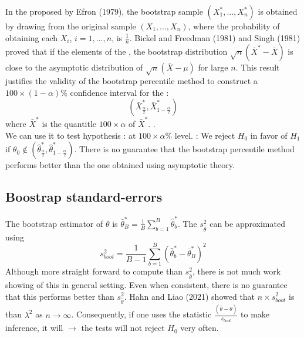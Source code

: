 In the  proposed by Efron (1979), the bootstrap sample $(X_1^*,\ldots,X_n^*)$ is obtained by drawing  from the original sample $(X_1,\ldots,X_n)$,
where the probability of obtaining each $X_i$, $i=1,\ldots,n$, is $\frac{1}{n}$. 
Bickel and Freedman (1981) and Singh (1981) proved that if the elements of the , the bootstrap distribution $\sqrt{n}(\bar{X}^*-\bar{X})$ is close to the asymptotic distribution of $\sqrt{n}(\bar{X}-\mu)$ for large $n$.
This result justifies the validity of the bootstrap percentile method to construct a $100 \times (1-\alpha)\%$ confidence interval for the :
\begin{equation*}
    (\bar{X}^*_{\frac{\alpha}{2}},\bar{X}^*_{1-\frac{\alpha}{2}})
\end{equation*}
where $\bar{X}^*$ is the quantitle $100\times\alpha$ of $\bar{X}^*$.
.\\

We can use it to test hypothesis :  at $100\times\alpha\%$ level.
: We reject $H_0$ in favor of $H_1$ if $\theta_0\notin (\hat{\theta}^*_{\frac{\alpha}{2}}, \hat{\theta}^*_{1-\frac{\alpha}{2}})$.
There is no guarantee that the bootstrap percentile method performs better than the one obtained using asymptotic theory.

\subsection{Boostrap standard-errors}

The bootstrap estimator of $\theta$ is $\bar{\theta}^*_B = \frac{1}{B}\sum_{b=1}^{B}\hat{\theta}^*_b$. The $s^2_{\hat{\theta}}$ can be approximated using
\begin{equation}
    s^2_{boot}= \frac{1}{B-1}\sum_{b=1}^{B}\left(\hat{\theta}^*_b - \bar{\theta}^*_B\right)^2
\end{equation}
Although more straight forward to compute than $s^2_{\hat{\theta}}$, there is not much work showing  of this in general setting.
Even when consistent, there is no guarantee that this performs better than $s^2_{\hat{\theta}}$.
Hahn and Liao (2021) showed that $n\times s^2_{boot}$ is  than $\lambda^2$ as $n\to\infty$.
Consequently, if one uses the statistic $\frac{(\hat{\theta}-\theta)}{s_{boot}}$ to make inference, it will $\to$ the tests will not reject $H_0$ very often.

